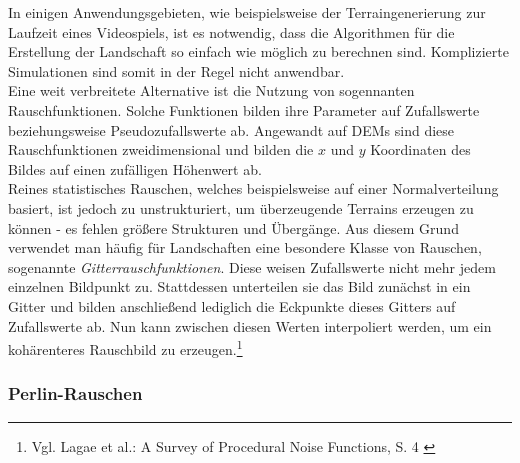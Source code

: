 In einigen Anwendungsgebieten, wie beispielsweise der Terraingenerierung zur Laufzeit eines Videospiels, ist es notwendig, dass die Algorithmen für die Erstellung der Landschaft so einfach wie möglich zu berechnen sind. Komplizierte Simulationen sind somit in der Regel nicht anwendbar. \\ 
Eine weit verbreitete Alternative ist die Nutzung von sogennanten Rauschfunktionen. Solche Funktionen bilden ihre Parameter auf Zufallswerte beziehungsweise Pseudozufallswerte ab. Angewandt auf \ac{DEM}s sind diese Rauschfunktionen zweidimensional und bilden die $x$ und $y$ Koordinaten des Bildes auf einen zufälligen Höhenwert ab. \\ 
Reines statistisches Rauschen, welches beispielsweise auf einer Normalverteilung basiert, ist jedoch zu unstrukturiert, um überzeugende Terrains erzeugen zu können - es fehlen größere Strukturen und Übergänge. Aus diesem Grund verwendet man häufig für Landschaften eine besondere Klasse von Rauschen, sogenannte \textit{Gitterrauschfunktionen}. Diese weisen Zufallswerte nicht mehr jedem einzelnen Bildpunkt zu. Stattdessen unterteilen sie das Bild zunächst in ein Gitter und bilden anschließend lediglich die Eckpunkte dieses Gitters auf Zufallswerte ab. Nun kann zwischen diesen Werten interpoliert werden, um ein kohärenteres Rauschbild zu erzeugen.\footnote{
    Vgl. Lagae et al.: A Survey of Procedural Noise Functions, S. 4
    \cite{https://doi.org/10.1111/j.1467-8659.2010.01827.x}
}  

\subsubsection{Perlin-Rauschen}

